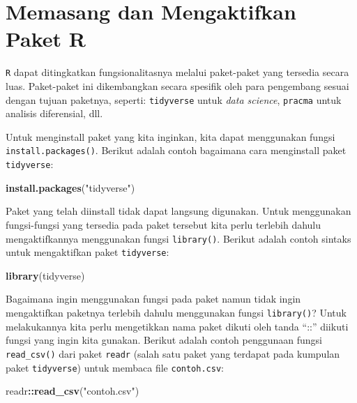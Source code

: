 \documentclass[]{book}
\newenvironment{Shaded}{\begin{snugshade}}{\end{snugshade}}
\newcommand{\KeywordTok}[1]{\textcolor[rgb]{0.13,0.29,0.53}{\textbf{#1}}}
\newcommand{\NormalTok}[1]{#1}
\newcommand{\OperatorTok}[1]{\textcolor[rgb]{0.81,0.36,0.00}{\textbf{#1}}}
\newcommand{\StringTok}[1]{\textcolor[rgb]{0.31,0.60,0.02}{#1}}
\theoremstyle{definition}
\theoremstyle{definition}
\theoremstyle{definition}
\theoremstyle{remark}
\begin{document}
\hypertarget{installlibraryR}{%
\section{Memasang dan Mengaktifkan Paket R}\label{installlibraryR}}

\texttt{R} dapat ditingkatkan fungsionalitasnya melalui paket-paket yang tersedia secara luas. Paket-paket ini dikembangkan secara spesifik oleh para pengembang sesuai dengan tujuan paketnya, seperti: \texttt{tidyverse} untuk \emph{data science}, \texttt{pracma} untuk analisis diferensial, dll.

Untuk menginstall paket yang kita inginkan, kita dapat menggunakan fungsi \texttt{install.packages()}. Berikut adalah contoh bagaimana cara menginstall paket \texttt{tidyverse}:

\begin{Shaded}
\begin{Highlighting}[]
\KeywordTok{install.packages}\NormalTok{(}\StringTok{"tidyverse"}\NormalTok{)}
\end{Highlighting}
\end{Shaded}

Paket yang telah diinstall tidak dapat langsung digunakan. Untuk menggunakan fungsi-fungsi yang tersedia pada paket tersebut kita perlu terlebih dahulu mengaktifkannya menggunakan fungsi \texttt{library()}. Berikut adalah contoh sintaks untuk mengaktifkan paket \texttt{tidyverse}:

\begin{Shaded}
\begin{Highlighting}[]
\KeywordTok{library}\NormalTok{(tidyverse)}
\end{Highlighting}
\end{Shaded}

Bagaimana ingin menggunakan fungsi pada paket namun tidak ingin mengaktifkan paketnya terlebih dahulu menggunakan fungsi \texttt{library()}? Untuk melakukannya kita perlu mengetikkan nama paket dikuti oleh tanda ``::'' diikuti fungsi yang ingin kita gunakan. Berikut adalah contoh penggunaan fungsi \texttt{read\_csv()} dari paket \texttt{readr} (salah satu paket yang terdapat pada kumpulan paket \texttt{tidyverse}) untuk membaca file \texttt{contoh.csv}:

\begin{Shaded}
\begin{Highlighting}[]
\NormalTok{readr}\OperatorTok{::}\KeywordTok{read_csv}\NormalTok{(}\StringTok{"contoh.csv"}\NormalTok{)}
\end{Highlighting}
\end{Shaded}
\end{document}
